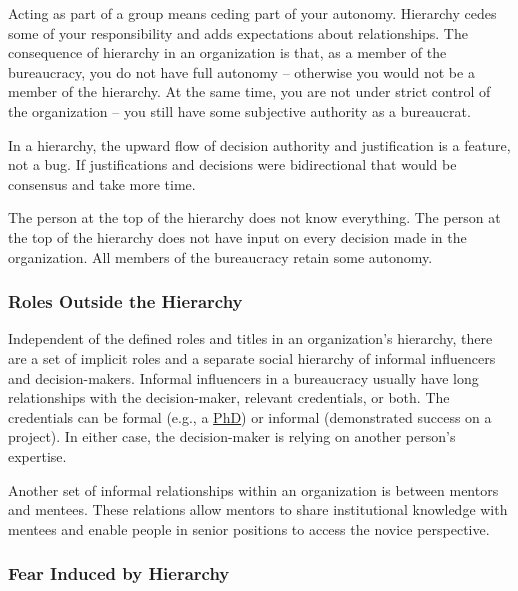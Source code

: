 Acting as part of a group means ceding part of your autonomy. Hierarchy cedes some of your responsibility and adds expectations about relationships.
The consequence of hierarchy in an organization is that, as a member of the bureaucracy, you do not have full autonomy -- otherwise you would not be a member of the hierarchy. At the same time, you are not under strict control of the organization -- you still have some subjective %
authority as a bureaucrat.

In a hierarchy, the upward flow of decision authority and justification is a feature, not a bug.
If justifications and decisions were bidirectional that would be consensus and take more time.

The person at the top of the hierarchy does not know everything. The person at the top of the hierarchy does not have input on every decision made in the organization. All members of the bureaucracy retain some autonomy.

\subsubsection*{Roles Outside the Hierarchy}

Independent of the defined roles and titles in an organization's hierarchy, there are a set of implicit roles and a separate social hierarchy of informal influencers and decision-makers. Informal influencers in a bureaucracy usually have long relationships with the decision-maker, relevant credentials, or both. The credentials can be formal (e.g., a \href{https://en.wikipedia.org/wiki/Doctor_of_Philosophy}{PhD}) 
\iftoggle{WPinmargin}{\marginpar{$>$Wikipedia: Doctor of Philosophy}}{}
or informal (demonstrated success on a project). In either case, the decision-maker is relying on another person's expertise. 

Another set of informal relationships within an organization is between mentors and mentees. These relations allow mentors to share institutional knowledge with mentees and enable people in senior positions to access the novice perspective. 


\subsubsection*{Fear Induced by Hierarchy}

